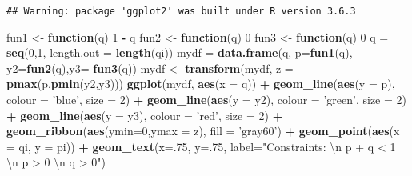 \documentclass[]{article}
\newenvironment{Shaded}{\begin{snugshade}}{\end{snugshade}}
\newcommand{\KeywordTok}[1]{\textcolor[rgb]{0.13,0.29,0.53}{\textbf{#1}}}
\newcommand{\DataTypeTok}[1]{\textcolor[rgb]{0.13,0.29,0.53}{#1}}
\newcommand{\DecValTok}[1]{\textcolor[rgb]{0.00,0.00,0.81}{#1}}
\newcommand{\CharTok}[1]{\textcolor[rgb]{0.31,0.60,0.02}{#1}}
\newcommand{\StringTok}[1]{\textcolor[rgb]{0.31,0.60,0.02}{#1}}
\newcommand{\ControlFlowTok}[1]{\textcolor[rgb]{0.13,0.29,0.53}{\textbf{#1}}}
\newcommand{\OperatorTok}[1]{\textcolor[rgb]{0.81,0.36,0.00}{\textbf{#1}}}
\newcommand{\NormalTok}[1]{#1}
\begin{document}
\begin{verbatim}
## Warning: package 'ggplot2' was built under R version 3.6.3
\end{verbatim}

\begin{Shaded}
\begin{Highlighting}[]
\NormalTok{fun1 <-}\StringTok{ }\ControlFlowTok{function}\NormalTok{(q) }\DecValTok{1} \OperatorTok{-}\StringTok{ }\NormalTok{q}
\NormalTok{fun2 <-}\StringTok{ }\ControlFlowTok{function}\NormalTok{(q) }\DecValTok{0}
\NormalTok{fun3 <-}\StringTok{ }\ControlFlowTok{function}\NormalTok{(q) }\DecValTok{0}
\NormalTok{q =}\StringTok{ }\KeywordTok{seq}\NormalTok{(}\DecValTok{0}\NormalTok{,}\DecValTok{1}\NormalTok{, }\DataTypeTok{length.out =} \KeywordTok{length}\NormalTok{(qi))}
\NormalTok{mydf =}\StringTok{ }\KeywordTok{data.frame}\NormalTok{(q, }\DataTypeTok{p=}\KeywordTok{fun1}\NormalTok{(q), }\DataTypeTok{y2=}\KeywordTok{fun2}\NormalTok{(q),}\DataTypeTok{y3=} \KeywordTok{fun3}\NormalTok{(q))}
\NormalTok{mydf <-}\StringTok{  }\KeywordTok{transform}\NormalTok{(mydf, }\DataTypeTok{z =} \KeywordTok{pmax}\NormalTok{(p,}\KeywordTok{pmin}\NormalTok{(y2,y3)))}
\KeywordTok{ggplot}\NormalTok{(mydf, }\KeywordTok{aes}\NormalTok{(}\DataTypeTok{x =}\NormalTok{ q)) }\OperatorTok{+}\StringTok{ }
\StringTok{  }\KeywordTok{geom_line}\NormalTok{(}\KeywordTok{aes}\NormalTok{(}\DataTypeTok{y =}\NormalTok{ p), }\DataTypeTok{colour =} \StringTok{'blue'}\NormalTok{, }\DataTypeTok{size =} \DecValTok{2}\NormalTok{) }\OperatorTok{+}
\StringTok{  }\KeywordTok{geom_line}\NormalTok{(}\KeywordTok{aes}\NormalTok{(}\DataTypeTok{y =}\NormalTok{ y2), }\DataTypeTok{colour =} \StringTok{'green'}\NormalTok{, }\DataTypeTok{size =} \DecValTok{2}\NormalTok{) }\OperatorTok{+}
\StringTok{  }\KeywordTok{geom_line}\NormalTok{(}\KeywordTok{aes}\NormalTok{(}\DataTypeTok{y =}\NormalTok{ y3), }\DataTypeTok{colour =} \StringTok{'red'}\NormalTok{, }\DataTypeTok{size =} \DecValTok{2}\NormalTok{) }\OperatorTok{+}
\StringTok{  }\KeywordTok{geom_ribbon}\NormalTok{(}\KeywordTok{aes}\NormalTok{(}\DataTypeTok{ymin=}\DecValTok{0}\NormalTok{,}\DataTypeTok{ymax =}\NormalTok{ z), }\DataTypeTok{fill =} \StringTok{'gray60'}\NormalTok{) }\OperatorTok{+}\StringTok{ }
\StringTok{  }\KeywordTok{geom_point}\NormalTok{(}\KeywordTok{aes}\NormalTok{(}\DataTypeTok{x =}\NormalTok{ qi, }\DataTypeTok{y =}\NormalTok{ pi)) }\OperatorTok{+}
\StringTok{  }\KeywordTok{geom_text}\NormalTok{(}\DataTypeTok{x=}\NormalTok{.}\DecValTok{75}\NormalTok{, }\DataTypeTok{y=}\NormalTok{.}\DecValTok{75}\NormalTok{, }\DataTypeTok{label=}\StringTok{"Constraints: }\CharTok{\textbackslash{}n}\StringTok{ p + q < 1 }\CharTok{\textbackslash{}n}\StringTok{ p > 0 }\CharTok{\textbackslash{}n}\StringTok{ q > 0"}\NormalTok{)}
\end{Highlighting}
\end{Shaded}
\end{document}
